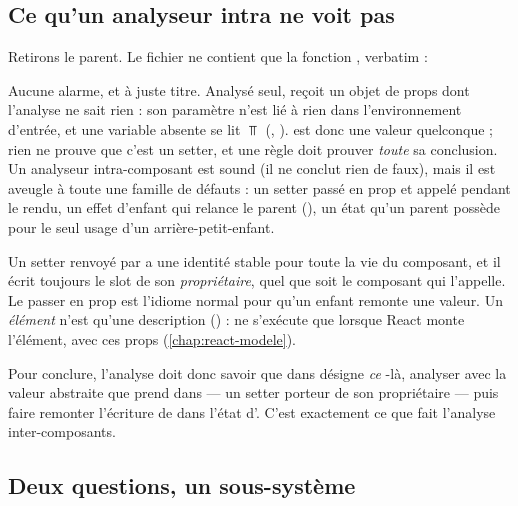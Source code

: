 \subsection{Ce qu'un analyseur intra ne voit pas}

Retirons le parent. Le fichier  ne contient que la fonction
, verbatim :


Aucune alarme, et à juste titre. Analysé seul,  reçoit un objet de props dont
l'analyse ne sait rien : son paramètre n'est lié à rien dans l'environnement d'entrée, et une
variable absente se lit $\Top$ (,
).  est donc \og une valeur
quelconque\fg{} ; rien ne prouve que c'est un setter, et une règle \Error{} doit prouver
\emph{toute} sa conclusion. Un analyseur intra-composant est sound (il ne conclut rien de faux),
mais il est aveugle à toute une famille de défauts : un setter passé en prop et appelé
pendant le rendu, un effet d'enfant qui relance le parent (),
un état qu'un parent possède pour le seul usage d'un arrière-petit-enfant.

\begin{react}
Un setter renvoyé par  a une identité stable pour toute la vie du composant,
et il écrit toujours le slot de son \emph{propriétaire}, quel que soit le composant qui
l'appelle. Le passer en prop est l'idiome normal pour qu'un enfant remonte une valeur. Un
\emph{élément}  n'est qu'une description () :  ne s'exécute que lorsque React monte l'élément, avec ces props
(\cref{chap:react-modele}).
\end{react}

Pour conclure, l'analyse doit donc savoir que  dans  désigne
\emph{ce} -là, analyser  avec la valeur abstraite que prend
 dans  --- un setter porteur de son propriétaire --- puis faire
remonter l'écriture de  dans l'état d'. C'est exactement ce que fait
l'analyse inter-composants.

\subsection{Deux questions, un sous-système}

